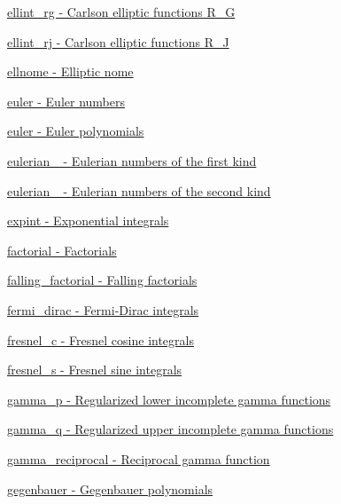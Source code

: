 \begin{DoxyItemize}
\item \hyperlink{group__mathsf__gnu_gadf618529d6106c1c1bc1e9212c4fed12}{ellint\+\_\+rg -\/ Carlson elliptic functions R\+\_\+G}
\item \hyperlink{group__mathsf__gnu_gadccabc8df929cc03745286ed1574a3ba}{ellint\+\_\+rj -\/ Carlson elliptic functions R\+\_\+J}
\item \hyperlink{group__mathsf__gnu_ga7bfb34f8b5c0ed7c72040f9cb7034bba}{ellnome -\/ Elliptic nome}
\item \hyperlink{group__mathsf__gnu_gac956e6457ab7d0d1765d281e73073f55}{euler -\/ Euler numbers}
\item \hyperlink{group__mathsf__gnu_gac956e6457ab7d0d1765d281e73073f55}{euler -\/ Euler polynomials}
\item \hyperlink{group__mathsf__gnu_gadfd8810a97655d2cdd1b0e3af68a79d3}{eulerian\+\_ -\/ Eulerian numbers of the first kind}
\item \hyperlink{group__mathsf__gnu_ga9bc456941d5e35cf54ec9c50f2e52884}{eulerian\+\_ -\/ Eulerian numbers of the second kind}
\item \hyperlink{group__mathsf__gnu_gadaf9317953b826975da72d1858f01ea5}{expint -\/ Exponential integrals}
\item \hyperlink{group__mathsf__gnu_ga963b1612f50b0964f5f42c9f289aab68}{factorial -\/ Factorials}
\item \hyperlink{group__mathsf__gnu_ga3cc8eb6068c7155ec48b40e20160c5c0}{falling\+\_\+factorial -\/ Falling factorials}
\item \hyperlink{group__mathsf__gnu_ga5468fbaed5cb8384cff7cfb9d2188d1a}{fermi\+\_\+dirac -\/ Fermi-\/\+Dirac integrals}
\item \hyperlink{group__mathsf__gnu_ga92a3585165bfad3f9972fb4210140d22}{fresnel\+\_\+c -\/ Fresnel cosine integrals}
\item \hyperlink{group__mathsf__gnu_ga075a32b4f59a5fa67c2e28232c89ad45}{fresnel\+\_\+s -\/ Fresnel sine integrals}
\item \hyperlink{group__mathsf__gnu_ga692601fa7508c0b97bf549e6362a49b9}{gamma\+\_\+p -\/ Regularized lower incomplete gamma functions}
\item \hyperlink{group__mathsf__gnu_ga10c246b2fa2ce000dc5d7c81e9e98c58}{gamma\+\_\+q -\/ Regularized upper incomplete gamma functions}
\item \hyperlink{group__mathsf__gnu_ga641f9bcdb8fc32a9a0ce7a15b5040076}{gamma\+\_\+reciprocal -\/ Reciprocal gamma function}
\item \hyperlink{group__mathsf__gnu_ga512e7981e328d6184f604de1892048b6}{gegenbauer -\/ Gegenbauer polynomials}

\end{DoxyItemize}
